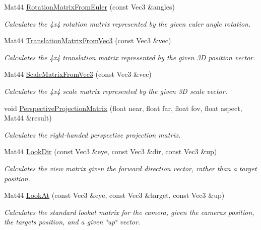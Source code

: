 \begin{DoxyCompactItemize}
Mat44 \hyperlink{group___s_i_s_d_mat_math_ga206e53fa5ea77b54765946af3d04ca0e}{Rotation\+Matrix\+From\+Euler} (const Vec3 \&angles)
\begin{DoxyCompactList}\small\item\em Calculates the 4x4 rotation matrix represented by the given euler angle rotation. \end{DoxyCompactList}\item 
Mat44 \hyperlink{group___s_i_s_d_mat_math_ga2d82d58bdc14d1f1644b05a7419ea05e}{Translation\+Matrix\+From\+Vec3} (const Vec3 \&vec)
\begin{DoxyCompactList}\small\item\em Calculates the 4x4 translation matrix represented by the given 3\+D position vector. \end{DoxyCompactList}\item 
Mat44 \hyperlink{group___s_i_s_d_mat_math_ga8ec877a1635b6a682a15195b47e1f21d}{Scale\+Matrix\+From\+Vec3} (const Vec3 \&vec)
\begin{DoxyCompactList}\small\item\em Calculates the 4x4 scale matrix represented by the given 3\+D scale vector. \end{DoxyCompactList}\item 
void \hyperlink{group___s_i_s_d_mat_math_ga8aa599fb24b0a8ce16acf8092ee29478}{Perspective\+Projection\+Matrix} (float near, float far, float fov, float aspect, Mat44 \&result)
\begin{DoxyCompactList}\small\item\em Calculates the right-\/handed perspective projection matrix. \end{DoxyCompactList}\item 
Mat44 \hyperlink{group___s_i_s_d_mat_math_ga1d0cf66e3877d2be1e104bbacec0c917}{Look\+Dir} (const Vec3 \&eye, const Vec3 \&dir, const Vec3 \&up)
\begin{DoxyCompactList}\small\item\em Calculates the view matrix given the forward direction vector, rather than a target position. \end{DoxyCompactList}\item 
Mat44 \hyperlink{group___s_i_s_d_mat_math_gac420c9cd578ebe0b21c9db7757bc4c2d}{Look\+At} (const Vec3 \&eye, const Vec3 \&target, const Vec3 \&up)
\begin{DoxyCompactList}\small\item\em Calculates the standard lookat matrix for the camera, given the camera\textquotesingle{}s position, the target\textquotesingle{}s position, and a given \char`\"{}up\char`\"{} vector. \end{DoxyCompactList}\item 

\end{DoxyCompactItemize}
